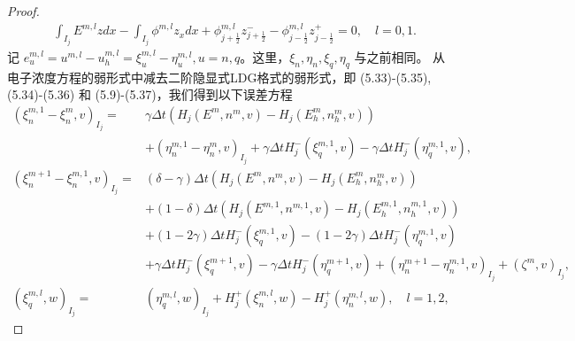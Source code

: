 \begin{proof}
\begin{align}
         & \int_{I_{j}} E^{m, l} z d x-\int_{I_{j}} \phi^{m, l} z_{x} d x+\phi_{j+\frac{1}{2}}^{m, l} z_{j+\frac{1}{2}}^{-}-\phi_{j-\frac{1}{2}}^{m, l} z_{j-\frac{1}{2}}^{+}=0, \quad l=0,1 .
    \end{align}
    记 $e_{u}^{m, l}=u^{m, l}-u_{h}^{m, l}=\xi_{u}^{m, l}-\eta_{u}^{m, l}, u=n, q$。这里，$\xi_{n}, \eta_{n}, \xi_{q}, \eta_{q}$ 与之前相同。 从电子浓度方程的弱形式中减去二阶隐显式LDG格式的弱形式，即 (5.33)-(5.35), (5.34)-(5.36) 和 (5.9)-(5.37)，我们得到以下误差方程
    \begin{align*}
        \left(\xi_{n}^{m, 1}-\xi_{n}^{m}, v\right)_{I_{j}}=   & \gamma \Delta t\left(H_{j}\left(E^{m}, n^{m}, v\right)-H_{j}\left(E_{h}^{m}, n_{h}^{m}, v\right)\right)                                                                                                   \\
                                                              & +\left(\eta_{n}^{m, 1}-\eta_{n}^{m}, v\right)_{I_{j}}+\gamma \Delta t H_{j}^{-}\left(\xi_{q}^{m, 1}, v\right)-\gamma \Delta t H_{j}^{-}\left(\eta_{q}^{m, 1}, v\right),                                   \\
        \left(\xi_{n}^{m+1}-\xi_{n}^{m, 1}, v\right)_{I_{j}}= & (\delta-\gamma) \Delta t\left(H_{j}\left(E^{m}, n^{m}, v\right)-H_{j}\left(E_{h}^{m}, n_{h}^{m}, v\right)\right)                                                                                          \\
                                                              & +(1-\delta) \Delta t\left(H_{j}\left(E^{m, 1}, n^{m, 1}, v\right)-H_{j}\left(E_{h}^{m, 1}, n_{h}^{m, 1}, v\right)\right)                                                                                  \\
                                                              & +(1-2 \gamma) \Delta t H_{j}^{-}\left(\xi_{q}^{m, 1}, v\right)-(1-2 \gamma) \Delta t H_{j}^{-}\left(\eta_{q}^{m, 1}, v\right)                                                                             \\
                                                              & +\gamma \Delta t H_{j}^{-}\left(\xi_{q}^{m+1}, v\right)-\gamma \Delta t H_{j}^{-}\left(\eta_{q}^{m+1}, v\right)+\left(\eta_{n}^{m+1}-\eta_{n}^{m, 1}, v\right)_{I_{j}}+\left(\zeta^{m}, v\right)_{I_{j}}, \\
        \left(\xi_{q}^{m, l}, w\right)_{I_{j}}=               & \left(\eta_{q}^{m, l}, w\right)_{I_{j}}+H_{j}^{+}\left(\xi_{n}^{m, l}, w\right)-H_{j}^{+}\left(\eta_{n}^{m, l}, w\right), \quad l=1,2,

\end{align*}
\end{proof}

